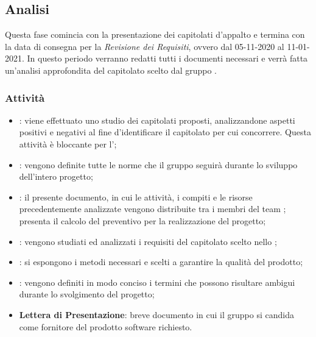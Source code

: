 \subsection{Analisi}
Questa fase comincia con la presentazione dei capitolati d'appalto e termina con la data di consegna per la \textit{Revisione dei Requisiti}, ovvero dal 05-11-2020 al 11-01-2021.
In questo periodo verranno redatti tutti i documenti necessari e verrà fatta un'analisi approfondita del capitolato scelto dal gruppo \Gruppo{}.
\subsubsection{Attività}
\begin{itemize}
\item \textbf{\SdF}: viene effettuato uno studio dei capitolati proposti, analizzandone aspetti positivi e negativi al fine d'identificare il capitolato per cui concorrere. Questa attività è bloccante per l'\textit{\AdR};
\item \textbf{\NdP}: vengono definite tutte le norme che il gruppo \Gruppo{} seguirà durante lo sviluppo dell'intero progetto;
\item \textbf{\PdP}: il presente documento, in cui le attività, i compiti\glo{} e le risorse precedentemente analizzate vengono distribuite tra i membri del team \Gruppo{}; presenta il calcolo del preventivo per la realizzazione del progetto;
\item \textbf{\AdR}: vengono studiati ed analizzati i requisiti del capitolato\glo{} scelto nello \textit{\SdF};
\item \textbf{\PdQ}: si espongono i metodi necessari e scelti a garantire la qualità del prodotto;
\item \textbf{\Glossario}: vengono definiti in modo conciso i termini che possono risultare ambigui durante lo svolgimento del progetto;
\item \textbf{Lettera di Presentazione}: breve documento in cui il gruppo \Gruppo{} si candida come fornitore del prodotto software richiesto.
\end{itemize}

